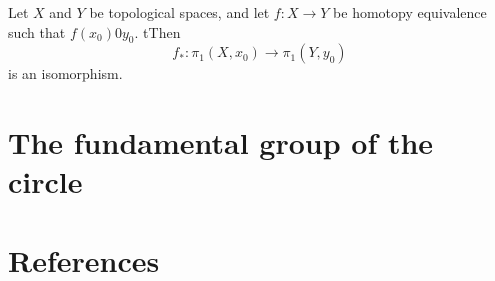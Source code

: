 \documentclass{article}
\theoremstyle{remark}
\begin{document}
\begin{theorem}
    Let $X$ and $Y$ be topological spaces, and let $f: X \to Y$ be homotopy equivalence such that $f\left( x_{0} \right)
    0 y_{0}$. tThen \[
    f_{*}: \pi _{1}\left( X, x_{0} \right) \to  \pi _{1}\left( Y, y_{0} \right)
    \]
    is an isomorphism.
\end{theorem}

\section{ The fundamental group of the circle}%
\label{sec:the_fundamental_group_of_the_circle}




\newpage
\section{References}%
\label{sec:references}



\end{document}
